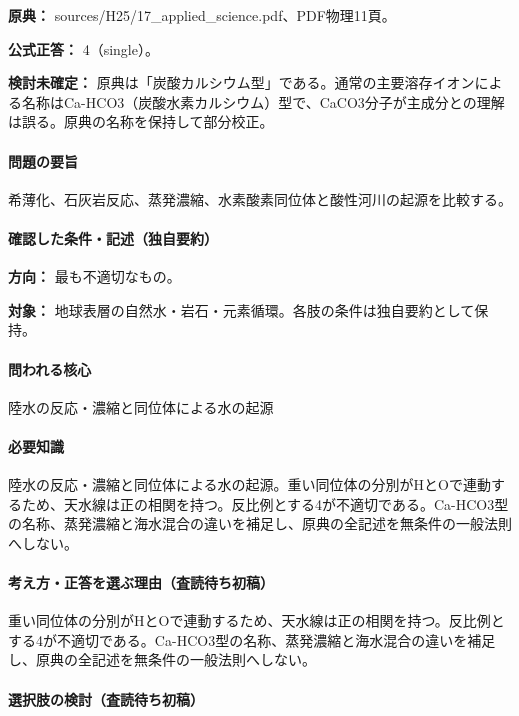 \noindent\textbf{原典：} sources/H25/17\_applied\_science.pdf、PDF物理11頁。

\textbf{公式正答：} 4（single）。

\par\textbf{検討未確定：} 原典は「炭酸カルシウム型」である。通常の主要溶存イオンによる名称はCa-HCO3（炭酸水素カルシウム）型で、CaCO3分子が主成分との理解は誤る。原典の名称を保持して部分校正。

\paragraph{問題の要旨} 希薄化、石灰岩反応、蒸発濃縮、水素酸素同位体と酸性河川の起源を比較する。

\paragraph{確認した条件・記述（独自要約）}\mbox{}\par

\noindent\textbf{方向：} 最も不適切なもの。\par

\noindent\textbf{対象：} 地球表層の自然水・岩石・元素循環。各肢の条件は独自要約として保持。\par

\paragraph{問われる核心} 陸水の反応・濃縮と同位体による水の起源

\paragraph{必要知識} 陸水の反応・濃縮と同位体による水の起源。重い同位体の分別がHとOで連動するため、天水線は正の相関を持つ。反比例とする4が不適切である。Ca-HCO3型の名称、蒸発濃縮と海水混合の違いを補足し、原典の全記述を無条件の一般法則へしない。

\paragraph{考え方・正答を選ぶ理由（査読待ち初稿）} 重い同位体の分別がHとOで連動するため、天水線は正の相関を持つ。反比例とする4が不適切である。Ca-HCO3型の名称、蒸発濃縮と海水混合の違いを補足し、原典の全記述を無条件の一般法則へしない。

\paragraph{選択肢の検討（査読待ち初稿）}\mbox{}\par

